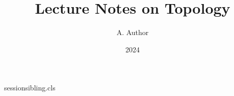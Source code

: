 \begin{filecontents*}[overwrite]{sessionsibling.cls}
\def\@maketitle{%
  \begin{center}
    {\LARGE \@title \par}
    \vskip 1em \@date\par
    \ifnum\@date>2000 Recent edition\par\fi
    \setcounter{yr}{\@date}Year \arabic{yr}\par
    Next \the\numexpr\@date+1\relax\par
    \@tempdima=\@date pt Width \the\@tempdima\par
  \end{center}\par}
\end{filecontents*}
\documentclass{sessionsibling}
\title{Lecture Notes on Topology}
\author{A. Author}
\date{2024}

\maketitle
Text.

